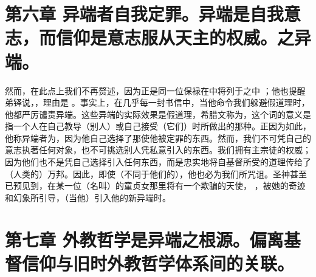 
\section{第六章 异端者自我定罪。异端是自我意志，而信仰是意志服从天主的权威。之异端。}

然而，在此点上我们不再赘述，因为正是同一位保禄在中将列于之中 ；他也提醒弟铎说，，理由是 。事实上，在几乎每一封书信中，当他命令我们躲避假道理时，他都严厉谴责异端。这些异端的实际效果是假道理，希腊文称为，这个词的意义是指一个人在自己教导（别人）或自己接受（它们）时所做出的那种。正因为如此，他称异端者为，因为他自己选择了那使他被定罪的东西。然而，我们不可凭自己的意志执著任何对象，也不可挑选别人凭私意引入的东西。我们拥有主宗徒的权威；因为他们也不是凭自己选择引入任何东西，而是忠实地将自基督所受的道理传给了（人类的）万邦。因此，即使（不同于他们的），他也必为我们所咒诅。圣神甚至已预见到，在某一位（名叫）的童贞女那里将有一个欺骗的天使， ，被她的奇迹和幻象所引导，（当他）引入他的新异端时。\par


\section{第七章 外教哲学是异端之根源。偏离基督信仰与旧时外教哲学体系间的关联。}

